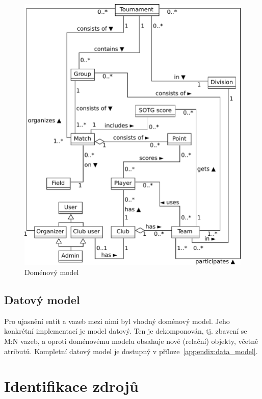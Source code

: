 \begin{figure}[ht!]
\centering
\includegraphics[width=130mm]{./images/domenovy-model.pdf}
\caption{Doménový model\label{overflow}}
\label{fig:domain_model}
\end{figure}

\subsection{Datový model}

Pro ujasnění entit a vazeb mezi nimi byl vhodný doménový model. Jeho konkrétní implementací je model datový.
Ten je dekomponován, tj. zbavení se M:N vazeb, a oproti doménovému modelu obsahuje nové
(relační) objekty, včetně atributů. Kompletní datový model je dostupný v příloze~\ref{appendix:data_model}.

\section{Identifikace zdrojů}


